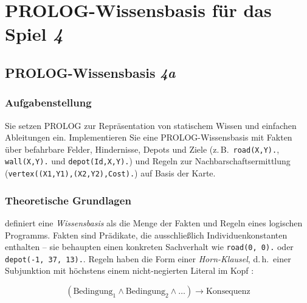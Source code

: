
\chapter{\acs{PROLOG}-Wissensbasis für das Spiel \textit{4}}
\label{chap:aufgabe4}
\thispagestyle{fancy}


\section{\acs{PROLOG}-Wissensbasis \textit{4a}}
\label{sec:aufgabe4a}

\subsection{Aufgabenstellung}

Sie setzen \acs{PROLOG} zur Repräsentation von statischem Wissen und einfachen Ableitungen ein. Implementieren Sie eine \acs{PROLOG}-Wissensbasis mit Fakten über befahrbare Felder, Hindernisse, Depots und Ziele (z.\,B.\ \texttt{road(X,Y).}, \texttt{wall(X,Y).} und \texttt{depot(Id,X,Y).}) und Regeln zur Nachbarschaftsermittlung (\texttt{vertex((X1,Y1),(X2,Y2),Cost).}) auf Basis der Karte.

\subsection{Theoretische Grundlagen}

\textcite[S. 61]{4} definiert eine \textit{Wissensbasis} als die Menge der Fakten und Regeln eines logischen Programms. Fakten sind Prädikate, die ausschließlich Individuenkonstanten enthalten -- sie behaupten einen konkreten Sachverhalt wie \texttt{road(0, 0).} oder \texttt{depot(-1, 37, 13).}. Regeln haben die Form einer \textit{Horn-Klausel}, d.\,h.\ einer Subjunktion mit höchstens einem nicht-negierten Literal im Kopf \cite[S. 27]{4}:

\[
(\text{Bedingung}_1 \wedge \text{Bedingung}_2 \wedge \dots) \rightarrow \text{Konsequenz}
\]

